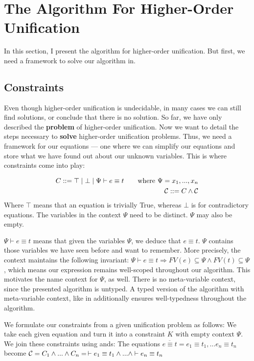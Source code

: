 \documentclass[twoside,12pt,a4paper]{article}
\begin{document}
\section{The Algorithm For Higher-Order Unification}\label{The Algorithm For Higher-Order Unification}
In this section, I present the algorithm for higher-order unification.
But first, we need a framework to solve our algorithm in.

\subsection{Constraints}

Even though higher-order unification is undecidable, in many cases we can still find solutions,
or conclude that there is no solution.
So far, we have only described the \textbf{problem} of higher-order unification. 
Now we want to detail the steps necessary to \textbf{solve} higher-order unification problems.
Thus, we need a framework for our equations --- one where we can simplify our equations
and store what we have found out about our unknown variables. This is where constraints come into play:

\begin{definition}[Constraint]
    \begin{align*}
        C ::= \top \;|\; \bot \;|\; \Psi \vdash e\equiv t \tag*{where $\Psi = x_1, ..., x_n$}\\
        \mathcal{C} ::= C \wedge \mathcal{C}
    \end{align*}
    Where $\top$ means that an equation is trivially True, whereas $\bot$ is for contradictory equations. 
    The variables in the context $\Psi$ need to be distinct. $\Psi$ may also be empty.
\end{definition}
$\Psi \vdash e\equiv t$ means that given the variables $\Psi$, we deduce that $e\equiv t$.
$\Psi$ contains those variables we have seen before and want to remember.
More precisely, the context maintains the following invariant:
$\Psi \vdash e\equiv t \Rightarrow FV(e)\subseteq \Psi \wedge FV(t)\subseteq \Psi$, %
which means our expression remains well-scoped throughout our algorithm.
This motivates the name context for $\Psi$, as well.
There is no meta-variable context, since the presented algorithm is untyped. 
A typed version of the algorithm with meta-variable context, like in \cite{10.5555/2021953.2021960}
additionally ensures well-typedness throughout the algorithm. 

We formulate our constraints from a given unification problem as follows:
We take each given equation and turn it into a constraint $K$ with $\text{empty context }\Psi$. We join these constraints using ands:
The equations $\overline{e\equiv t}= e_1 \equiv t_1, ... e_n\equiv t_n$ become $\mathcal{C} = C_1 \wedge ... \wedge C_n = \, \vdash e_1 \equiv t_1 \wedge ...\wedge \vdash e_n \equiv t_n $  
\end{document}
